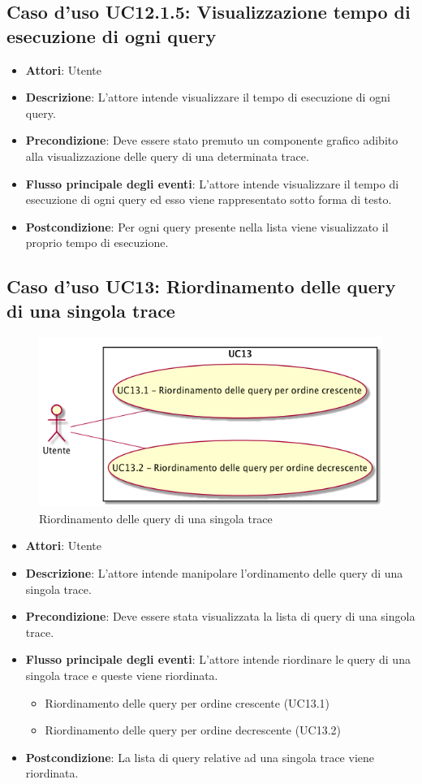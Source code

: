 \subsection{Caso d'uso UC12.1.5: Visualizzazione tempo di esecuzione di ogni query}
\begin{itemize}
	\item \textbf{Attori}: Utente
	\item \textbf{Descrizione}: L'attore intende visualizzare il tempo di esecuzione di ogni query.
	\item \textbf{Precondizione}: Deve essere stato premuto un componente grafico adibito alla visualizzazione delle query di una determinata trace.
	\item \textbf{Flusso principale degli eventi}: L'attore intende visualizzare il tempo di esecuzione di ogni query ed esso viene rappresentato sotto forma di testo.
	\item \textbf{Postcondizione}: Per ogni query presente nella lista viene visualizzato il proprio tempo di esecuzione.
\end{itemize}
\subsection{Caso d'uso UC13: Riordinamento delle query di una singola trace}
\begin{figure} [H]
	\centering
	\includegraphics[scale=0.45]{./UC/UC13.png}
	\caption{Riordinamento delle query di una singola trace}\label{}
\end{figure}
\begin{itemize}
	\item \textbf{Attori}: Utente
	\item \textbf{Descrizione}: L'attore intende manipolare l'ordinamento delle query di una singola trace.
	\item \textbf{Precondizione}: Deve essere stata visualizzata la lista di query di una singola trace.
	\item \textbf{Flusso principale degli eventi}: L'attore intende riordinare le query di una singola trace e queste viene riordinata.
	\begin{itemize}
		\item Riordinamento delle query per ordine crescente (UC13.1)
		\item Riordinamento delle query per ordine decrescente (UC13.2)
	\end{itemize}
	\item \textbf{Postcondizione}: La lista di query relative ad una singola trace viene riordinata.
\end{itemize}
